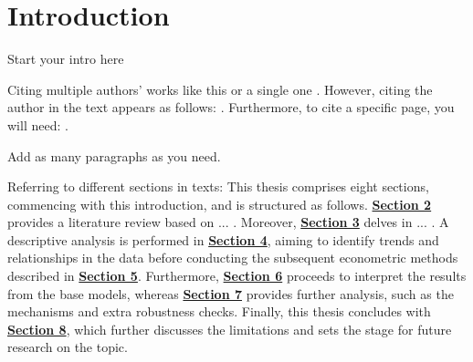 \onehalfspacing
\section{Introduction}\label{sec:intro}
\vspace{-0.5cm}

\justifying
Start your intro here

Citing multiple authors' works like this \citep[see][]{Brüderl2024, Huinink2011, Kreyenfeld2013} or a single one \citep[refer to][]{Schneider2021}.
However, citing the author in the text appears as follows: \cite{Bozoyan2021}. Furthermore, to cite a specific page, you will need: \citep[see][p. XX]{Goldin2024}.

Add as many paragraphs as you need.

Referring to different sections in texts: This thesis comprises eight sections, commencing with this introduction, and is structured as follows. 
\textbf{\hyperref[sec:literature]{Section 2}} provides a literature review based on ... . Moreover, \textbf{\hyperref[sec:empiricaldata]{Section 3}}
delves in ... . A descriptive analysis is performed in \textbf{\hyperref[sec:descriptive]{Section 4}}, aiming to identify trends and relationships in
the data before conducting the subsequent econometric methods described in \textbf{\hyperref[sec:methodology]{Section 5}}. Furthermore,
\textbf{\hyperref[sec:results]{Section 6}} proceeds to interpret the results from the base models, whereas \textbf{\hyperref[sec:furthernanalysis]{Section 7}}
provides further analysis, such as the mechanisms and extra robustness checks. Finally, this thesis concludes with \textbf{\hyperref[sec:discussion]{Section 8}},
which further discusses the limitations and sets the stage for future research on the topic.





